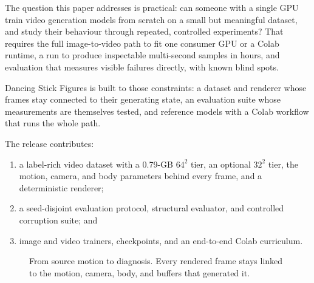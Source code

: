 \documentclass[10pt,twocolumn]{article}
\begin{document}
The question this paper addresses is practical: can someone with a single GPU train video generation models
from scratch on a small but meaningful dataset, and study their behaviour through repeated, controlled
experiments? That requires the full image-to-video path to fit one consumer GPU or a Colab runtime, a run to
produce inspectable multi-second samples in hours, and evaluation that measures visible failures directly,
with known blind spots.

Dancing Stick Figures is built to those constraints: a dataset and renderer whose frames stay connected to
their generating state, an evaluation suite whose measurements are themselves tested, and reference models
with a Colab workflow that runs the whole path.

The release contributes:
\begin{enumerate}
\item a label-rich video dataset with a 0.79-GB $64^2$ tier, an optional $32^2$ tier, the motion, camera, and
body parameters behind every frame, and a deterministic renderer;
\item a seed-disjoint evaluation protocol, structural evaluator, and controlled corruption suite; and
\item image and video trainers, checkpoints, and an end-to-end Colab curriculum.
\end{enumerate}

\begin{figure}[t]\centering
{}
\caption{From source motion to diagnosis. Every rendered frame stays linked to the motion, camera, body, and
buffers that generated it.}\label{fig:loop}
\end{figure}
\end{document}
